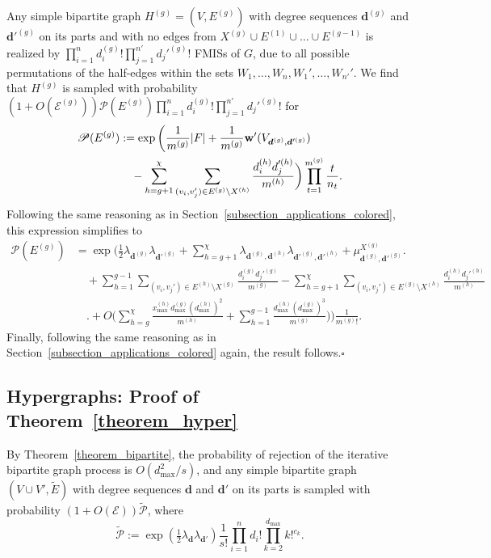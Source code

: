 \documentclass{article}
\theoremstyle{plain}
\theoremstyle{remark}
\theoremstyle{plain}
\numberwithin{equation}{section}
\renewcommand{\d}{{\boldsymbol{d}}}
\renewcommand{\b}{{\bf{w}}}
\begin{document}
	Any simple bipartite graph $H^{(g)}=(V,E^{(g)})$ with degree sequences $\d^{(g)}$ and $\d'^{(g)}$ on its parts and with no edges from $X^{(g)}\cup E^{(1)}\cup\ldots\cup E^{(g-1)}$ is realized by $\prod_{i=1}^{n}d_i^{(g)}!\prod_{j=1}^{n'}d_j'^{(g)}!$ FMISs of $G$, due to all possible permutations of the half-edges within the sets $W_1,\ldots,W_n,W_1',\ldots,W_{n'}'$. We find that $H^{(g)}$ is sampled with probability $(1+O(\mathscr{E}^{(g)}))\mathscr{P}(E^{(g)})\prod_{i=1}^{n}d_i^{(g)}!\prod_{j=1}^{n'}d_j'^{(g)}!$ for
	\begin{align}
		\mathscr{P}(E^{(g)})&:=\exp\bigg(\frac1{m^{(g)}}|F|+\frac1{m^{(g)}}\b'(V_{\d^{(g)},\d'^{(g)}})\bigg.
		\\&\quad\bigg.-\sum_{h=g+1}^{\chi}\sum_{(v_i,v_j')\in E^{(g)}\setminus X^{(h)}}\frac{d_i^{(h)}d_j'^{(h)}}{m^{(h)}}\bigg)\prod_{t=1}^{m^{(g)}}\frac{t}{n_t}.
	\end{align}
	Following the same reasoning as in Section~\ref{subsection_applications_colored}, this expression simplifies to
	\begin{align}
		\mathscr{P}(E^{(g)})&=\exp\Bigg(\tfrac12\lambda_{\d^{(g)}}\lambda_{\d'^{(g)}}+\sum_{h=g+1}^{\chi}\lambda_{\d^{(g)},\d^{(h)}}\lambda_{\d'^{(g)},\d'^{(h)}}+\mu_{\d^{(g)},\d'^{(g)}}^{X^{(g)}}\Bigg.
		\\&\quad+\sum_{h=1}^{g-1}\sum_{(v_i,v_j')\in E^{(h)}\setminus X^{(g)}}\frac{d_i^{(g)}d_j'^{(g)}}{m^{(g)}}-\sum_{h=g+1}^{\chi}\sum_{(v_i,v_j')\in E^{(g)}\setminus X^{(h)}}\frac{d_i^{(h)}d_j'^{(h)}}{m^{(h)}}
		\\&\quad\Bigg.+O\Bigg(\sum_{h=g}^{\chi}\frac{x_{\max}^{(h)}d_{\max}^{(g)}(d_{\max}^{(h)})^2}{m^{(h)}}+\sum_{h=1}^{g-1}\frac{d_{\max}^{(h)}(d_{\max}^{(g)})^3}{m^{(g)}}\Bigg)\Bigg)\frac1{m^{(g)}!}.
	\end{align}
	Finally, following the same reasoning as in Section~\ref{subsection_applications_colored} again, the result follows.\hfill$\square$
	
	\subsection{Hypergraphs: Proof of Theorem~\ref{theorem_hyper}}\label{subsection_applications_hyper}
	
	By Theorem~\ref{theorem_bipartite}, the probability of rejection of the iterative bipartite graph process is $O(d_{\max}^2/s)$, and any simple bipartite graph $(V\cup V',\widetilde{E})$ with degree sequences $\d$ and $\d'$ on its parts is sampled with probability $(1+O(\mathscr{E}))\widetilde{\mathscr{P}}$, where $$\widetilde{\mathscr{P}}:=\exp\left(\tfrac12\lambda_{\d}\lambda_{\d'}\right)\frac1{s!}\prod_{i=1}^{n}d_i!\prod_{k=2}^{d_{\max}}k!^{c_k}.$$
	
\end{document}
